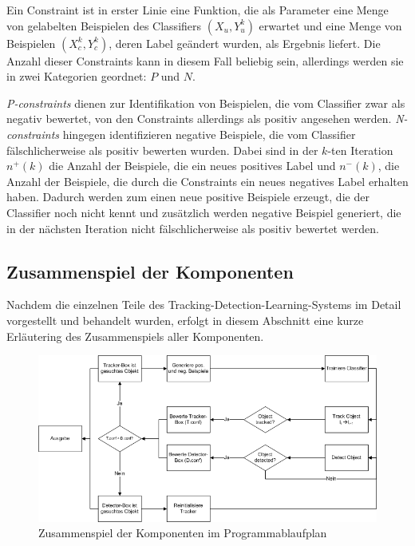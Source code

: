 	Ein Constraint ist in erster Linie eine Funktion, die als Parameter eine Menge von gelabelten Beispielen des Classifiers $(X_{u},Y_{u}^{k})$ erwartet und eine Menge von Beispielen $(X_{c}^{k},Y_{c}^{k})$, deren Label geändert wurden, als Ergebnis liefert. Die Anzahl dieser Constraints kann in diesem Fall beliebig sein, allerdings werden sie in zwei Kategorien geordnet: $P$ und $N$.

	\textit{P-constraints} dienen zur Identifikation von Beispielen, die vom Classifier zwar als negativ bewertet, von den Constraints allerdings als positiv angesehen werden. \textit{N-constraints} hingegen identifizieren negative Beispiele, die vom Classifier fälschlicherweise als positiv bewerten wurden. Dabei sind in der $k$-ten Iteration $n^{+}(k)$ die Anzahl der Beispiele, die ein neues positives Label und $n^{-}(k)$, die Anzahl der Beispiele, die durch die Constraints ein neues negatives Label erhalten haben. Dadurch werden zum einen neue positive Beispiele erzeugt, die der Classifier noch nicht kennt und zusätzlich werden negative Beispiel generiert, die in der nächsten Iteration nicht fälschlicherweise als positiv bewertet werden.

	\subsection{Zusammenspiel der Komponenten}
	Nachdem die einzelnen Teile des Tracking-Detection-Learning-Systems im Detail vorgestellt und behandelt wurden, erfolgt in diesem Abschnitt eine kurze Erläutering des Zusammenspiels aller Komponenten.

	\begin{figure}
	\includegraphics[scale=0.5]{../pictures/PAP.png}
	\caption{Zusammenspiel der Komponenten im Programmablaufplan}
	\label{abb:pap}
	\end{figure}

